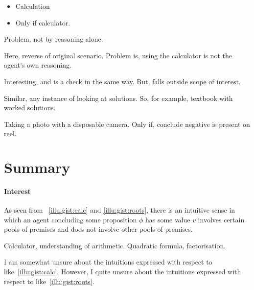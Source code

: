 \begin{note}[Calculator B]
  \begin{scenario}[Calculator B]
    \mbox{}
    \vspace{-\baselineskip}
    \begin{itemize}
    \item
      Calculation
    \item
      Only if calculator.
    \end{itemize}
  \end{scenario}

  Problem, not by reasoning alone.

  Here, reverse of original scenario.
  Problem is, using the calculator is not the agent's own reasoning.

  Interesting, and is a check in the same way.
  But, falls outside scope of interest.

  Similar, any instance of looking at solutions.
  So, for example, textbook with worked solutions.

  Taking a photo with a disposable camera.
  Only if, conclude negative is present on reel.
\end{note}

\section{Summary}

\paragraph*{Interest}

\begin{note}
  As seen from ~\ref{illu:gist:calc} and \ref{illu:gist:roots}, there is an intuitive sense in which an agent concluding some proposition \(\phi\) has some value \(v\) involves certain pools of premises and does not involve other pools of premises.

  Calculator, understanding of arithmetic.
  Quadratic formula, factorisation.

  I am somewhat unsure about the intuitions expressed with respect to  like~\autoref{illu:gist:calc}.
  However, I quite unsure about the intuitions expressed with respect to  like~\autoref{illu:gist:roots}.
\end{note}

